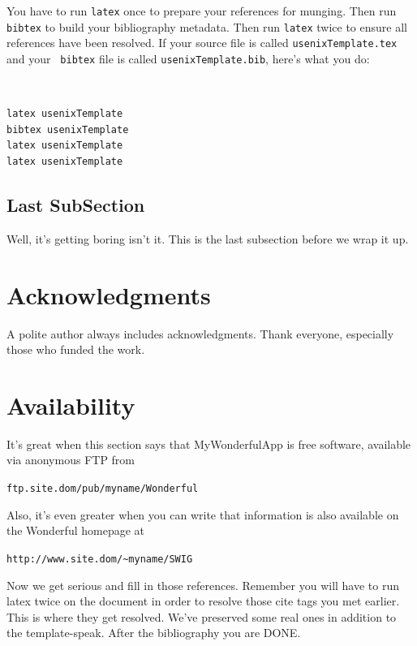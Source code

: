 \documentclass[letterpaper,twocolumn,10pt]{article}
\begin{document}
You have to run {\tt latex} once to prepare your references for
munging.  Then run {\tt bibtex} to build your bibliography metadata.
Then run {\tt latex} twice to ensure all references have been resolved.
If your source file is called {\tt usenixTemplate.tex} and your {\tt
  bibtex} file is called {\tt usenixTemplate.bib}, here's what you do:
{\tt \small
\begin{verbatim}
latex usenixTemplate
bibtex usenixTemplate
latex usenixTemplate
latex usenixTemplate
\end{verbatim}
}


\subsection{Last SubSection}

Well, it's getting boring isn't it.  This is the last subsection
before we wrap it up.

\section{Acknowledgments}

A polite author always includes acknowledgments.  Thank everyone,
especially those who funded the work. 

\section{Availability}

It's great when this section says that MyWonderfulApp is free software, 
available via anonymous FTP from

\begin{center}
{\tt ftp.site.dom/pub/myname/Wonderful}\\
\end{center}

Also, it's even greater when you can write that information is also 
available on the Wonderful homepage at 

\begin{center}
{\tt http://www.site.dom/\~{}myname/SWIG}
\end{center}

Now we get serious and fill in those references.  Remember you will
have to run latex twice on the document in order to resolve those
cite tags you met earlier.  This is where they get resolved.
We've preserved some real ones in addition to the template-speak.
After the bibliography you are DONE.

\footnotesize{
}

\theendnotes
\end{document}
